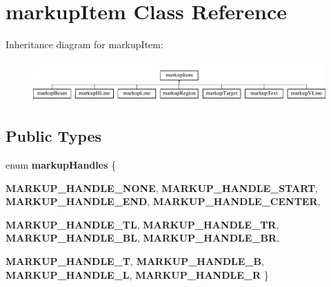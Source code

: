 \hypertarget{classmarkupItem}{
\section{markupItem Class Reference}
\label{classmarkupItem}
}
Inheritance diagram for markupItem:\begin{figure}[H]
\begin{center}
\leavevmode
\includegraphics[height=1.600000cm]{classmarkupItem}
\end{center}
\end{figure}
\subsection*{Public Types}
\begin{DoxyCompactItemize}
\item 
enum {\bfseries markupHandles} \{ \par
{\bfseries MARKUP\_\-HANDLE\_\-NONE}, 
{\bfseries MARKUP\_\-HANDLE\_\-START}, 
{\bfseries MARKUP\_\-HANDLE\_\-END}, 
{\bfseries MARKUP\_\-HANDLE\_\-CENTER}, 
\par
{\bfseries MARKUP\_\-HANDLE\_\-TL}, 
{\bfseries MARKUP\_\-HANDLE\_\-TR}, 
{\bfseries MARKUP\_\-HANDLE\_\-BL}, 
{\bfseries MARKUP\_\-HANDLE\_\-BR}, 
\par
{\bfseries MARKUP\_\-HANDLE\_\-T}, 
{\bfseries MARKUP\_\-HANDLE\_\-B}, 
{\bfseries MARKUP\_\-HANDLE\_\-L}, 
{\bfseries MARKUP\_\-HANDLE\_\-R}
 \}
\end{DoxyCompactItemize}
